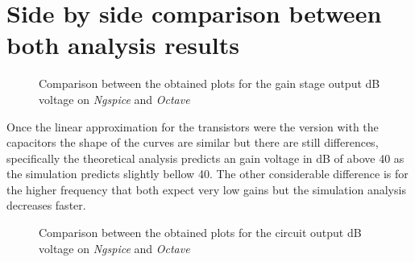 \section{Side by side comparison between both analysis results}
\label{sec:sidebyside}
\vspace{-85px}
\begin{figure}[H]
\hspace{-10mm}
  \hspace{-30px}
  \caption{Comparison between the obtained plots for the gain stage output dB voltage on \textit{Ngspice} and \textit{Octave}} 
\end{figure}

Once the linear approximation for the transistors were the version with the capacitors the shape of the curves are similar but there are still differences, specifically the theoretical analysis predicts an gain voltage in dB of above 40 as the simulation predicts slightly bellow 40. The other considerable difference is for the higher frequency that both expect very low gains but the simulation analysis decreases faster.

\vspace{-75px}
\begin{figure}[H]
\hspace{-10mm}
    \hspace{-30px}
  \caption{Comparison between the obtained plots for the circuit output dB voltage on \textit{Ngspice} and \textit{Octave}} 
\end{figure}

